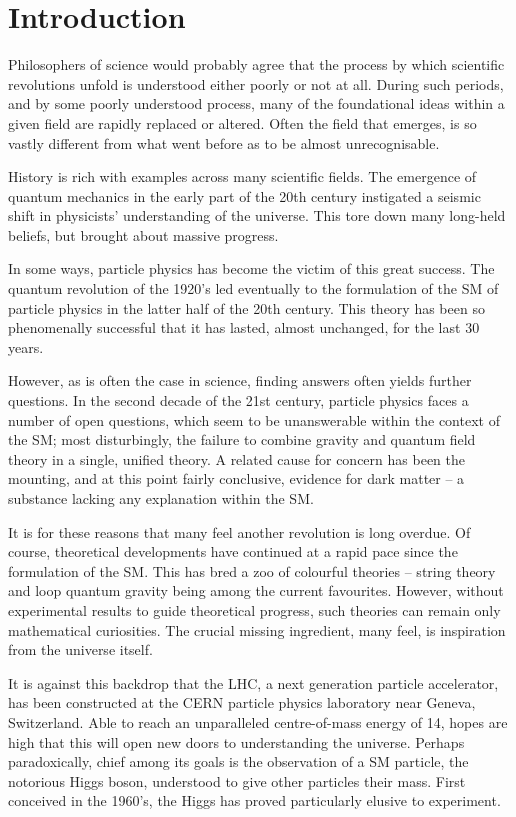 \chapter*{Introduction}

Philosophers of science would probably agree that the process by which
scientific revolutions unfold is understood either poorly or not at all. During
such periods, and by some poorly understood process, many of the foundational
ideas within a given field are rapidly replaced or altered. Often the field that
emerges, is so vastly different from what went before as to be almost
unrecognisable.

History is rich with examples across many scientific fields. The emergence of
quantum mechanics in the early part of the 20th century instigated a seismic
shift in physicists' understanding of the universe. This tore down many
long-held beliefs, but brought about massive progress.

In some ways, particle physics has become the victim of this great success. The
quantum revolution of the 1920's led eventually to the formulation of the
\acl{SM} of particle physics in the latter half of the 20th century. This theory
has been so phenomenally successful that it has lasted, almost unchanged, for
the last 30 years.

However, as is often the case in science, finding answers often yields further
questions. In the second decade of the 21st century, particle physics faces a
number of open questions, which seem to be unanswerable within the context of
the \ac{SM}; most disturbingly, the failure to combine gravity and quantum field
theory in a single, unified theory. A related cause for concern has been the
mounting, and at this point fairly conclusive, evidence for dark matter -- a
substance lacking any explanation within the \ac{SM}.

It is for these reasons that many feel another revolution is long overdue. Of
course, theoretical developments have continued at a rapid pace since the
formulation of the \ac{SM}. This has bred a zoo of colourful theories -- string
theory and loop quantum gravity being among the current favourites. However,
without experimental results to guide theoretical progress, such theories can
remain only mathematical curiosities. The crucial missing ingredient, many feel,
is inspiration from the universe itself.

It is against this backdrop that the \ac{LHC}, a next generation particle
accelerator, has been constructed at the \ac{CERN} particle physics laboratory
near Geneva, Switzerland. Able to reach an unparalleled centre-of-mass energy of
\unit{14}{\TeV}, hopes are high that this will open new doors to understanding
the universe. Perhaps paradoxically, chief among its goals is the observation of
a \ac{SM} particle, the notorious Higgs boson, understood to give other
particles their mass. First conceived in the 1960's, the Higgs has proved
particularly elusive to experiment.

